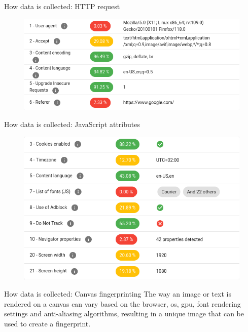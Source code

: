 \begin{frame}{How data is collected: HTTP request}
  \begin{figure}
    \centering
    \includegraphics[width=\textwidth]{images/http-data.png}
  \end{figure}
\end{frame}

\begin{frame}{How data is collected: JavaScript attributes}
  \begin{figure}
    \centering
    \includegraphics[width=\textwidth]{images/js-data.png}
  \end{figure}
\end{frame}

\begin{frame}{How data is collected: Canvas fingerprinting}
  The way an image or text is rendered on a canvas can vary based on the browser, os, gpu, font rendering settings and anti-aliasing algorithms, resulting in a unique image that can be used to create a fingerprint.
\end{frame}

